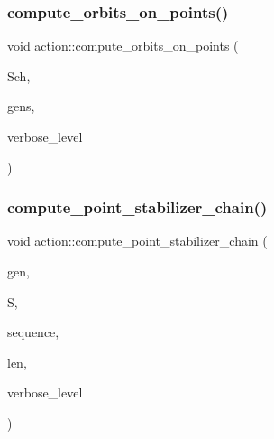 \mbox{\label{classaction_a20dec349ee5c2d0ab3373eba73ff4794}} 
\subsubsection{\texorpdfstring{compute\+\_\+orbits\+\_\+on\+\_\+points()}{compute\_orbits\_on\_points()}}
{\footnotesize\ttfamily void action\+::compute\+\_\+orbits\+\_\+on\+\_\+points (\begin{DoxyParamCaption}\item[{\mbox{\hyperlink{classschreier}{schreier}} $\ast$\&}]{Sch,  }\item[{\mbox{\hyperlink{classvector__ge}{vector\+\_\+ge}} $\ast$}]{gens,  }\item[{\mbox{\hyperlink{galois_8h_a09fddde158a3a20bd2dcadb609de11dc}{I\+NT}}}]{verbose\+\_\+level }\end{DoxyParamCaption})}

\mbox{\label{classaction_acf97cd992ce88d2c769e0a12210895ec}} 
\subsubsection{\texorpdfstring{compute\+\_\+point\+\_\+stabilizer\+\_\+chain()}{compute\_point\_stabilizer\_chain()}}
{\footnotesize\ttfamily void action\+::compute\+\_\+point\+\_\+stabilizer\+\_\+chain (\begin{DoxyParamCaption}\item[{\mbox{\hyperlink{classvector__ge}{vector\+\_\+ge}} \&}]{gen,  }\item[{\mbox{\hyperlink{classsims}{sims}} $\ast$}]{S,  }\item[{\mbox{\hyperlink{galois_8h_a09fddde158a3a20bd2dcadb609de11dc}{I\+NT}} $\ast$}]{sequence,  }\item[{\mbox{\hyperlink{galois_8h_a09fddde158a3a20bd2dcadb609de11dc}{I\+NT}}}]{len,  }\item[{\mbox{\hyperlink{galois_8h_a09fddde158a3a20bd2dcadb609de11dc}{I\+NT}}}]{verbose\+\_\+level }\end{DoxyParamCaption})}

